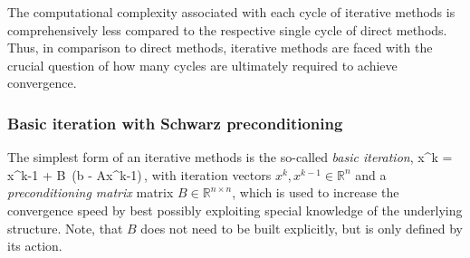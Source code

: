 The computational complexity associated with each cycle of iterative methods is comprehensively less compared to the respective single cycle of direct methods. Thus, in comparison to direct methods, iterative methods are faced with the crucial question of how many cycles are ultimately required to achieve convergence.

\subsubsection{Basic iteration with Schwarz preconditioning}
The simplest form of an iterative methods is the so-called {\it basic iteration}, 
\be 
  x^k = x^{k-1} + B\, (b - Ax^{k-1})\,, 
\label{EQ_basic_iteration}
\ee
with iteration vectors $x^k, x^{k-1} \in \mathbb{R}^{n}$  and a {\it preconditioning matrix} matrix $B \in \mathbb{R}^{n \times n}$, 
which is used to increase the convergence speed by best possibly exploiting special knowledge of the underlying structure. Note, that $B$ does not need to be built explicitly, but is only defined by its action. 

